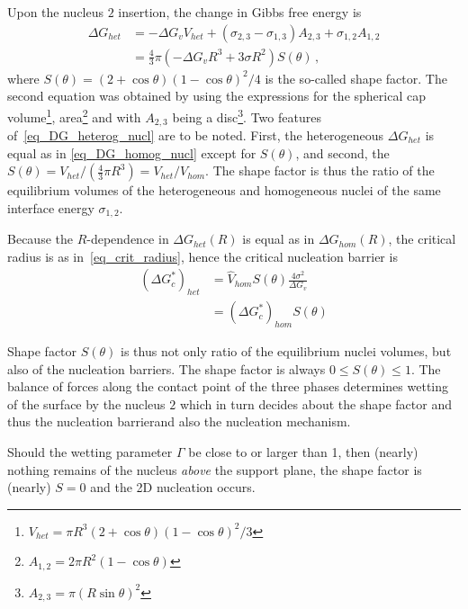         Upon the nucleus $\mathit{2}$ insertion, the change in Gibbs free energy is
        \begin{align}
            \Delta G_{het} &= -\Delta G_v V_{het} + (\sigma_{2,3}-\sigma_{1,3})A_{2,3} + \sigma_{1,2}A_{1,2} \\
                &= \frac{4}{3}\pi(-\Delta G_v R^3 + 3\sigma R^2) S(\theta) \,, \label{eq_DG_heterog_nucl}
        \end{align}
        where $S(\theta)=(2+\cos\theta)(1-\cos\theta)^2/4$ is the so-called shape factor. The second equation was obtained by using the expressions for the spherical cap volume\footnote{$V_{het}=\pi R^3(2+\cos\theta)(1-\cos\theta)^2/3$}, area\footnote{$A_{1,2}=2\pi R^2(1-\cos\theta)$} and with $A_{2,3}$ being a disc\footnote{$A_{2,3}=\pi(R\sin\theta)^2$}. Two features of~\eqref{eq_DG_heterog_nucl} are to be noted. First, the heterogeneous $\Delta G_{het}$ is equal as in \eqref{eq_DG_homog_nucl} except for $S(\theta)$, and second, the $S(\theta)=V_{het}/(\frac{4}{3}\pi R^3)=V_{het}/V_{hom}$. The shape factor is thus the ratio of the equilibrium volumes of the heterogeneous and homogeneous nuclei of the same interface energy $\sigma_{1,2}$.
        
        Because the $R$-dependence in $\Delta G_{het}(R)$ is equal as in $\Delta G_{hom}(R)$, the critical radius is as in~\eqref{eq_crit_radius}, hence the critical nucleation barrier is 
        \begin{align}
            (\Delta G^*_c)_{het} &= \hat{V}_{hom}S(\theta)\frac{4\sigma^2}{\Delta G_v} \\
                &= (\Delta G^*_c)_{hom}S(\theta)
        \end{align}
            
        Shape factor $S(\theta)$ is thus not only ratio of the equilibrium nuclei volumes, but also of the nucleation barriers. The shape factor is always $0\leq S(\theta)\leq1$. The balance of forces along the contact point of the three phases determines wetting of the surface by the nucleus $\mathit{2}$ which in turn decides about the shape factor and thus the nucleation barrierand also the nucleation mechanism. 
        
        Should the wetting parameter $\Gamma$ be close to or larger than 1, then (nearly) nothing remains of the nucleus \textit{above} the support plane, the shape factor is (nearly) $S=0$ and the 2D nucleation occurs. 
    
